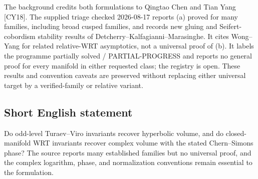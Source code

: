 \documentclass[11pt]{article}
\begin{document}
The background credits both formulations to Qingtao Chen and Tian Yang [CY18]. The supplied triage checked 2026-08-17 reports (a) proved for many families, including broad cusped families, and records new gluing and Seifert-cobordism stability results of Detcherry--Kalfagianni--Marasinghe. It cites Wong--Yang for related relative-WRT asymptotics, not a universal proof of (b). It labels the programme partially solved / PARTIAL-PROGRESS and reports no general proof for every manifold in either requested class; the registry is open. These results and convention caveats are preserved without replacing either universal target by a verified-family or relative variant.
\subsection{Short English statement}
Do odd-level Turaev--Viro invariants recover hyperbolic volume, and do closed-manifold WRT invariants recover complex volume with the stated Chern--Simons phase? The source reports many established families but no universal proof, and the complex logarithm, phase, and normalization conventions remain essential to the formulation.
\end{document}
